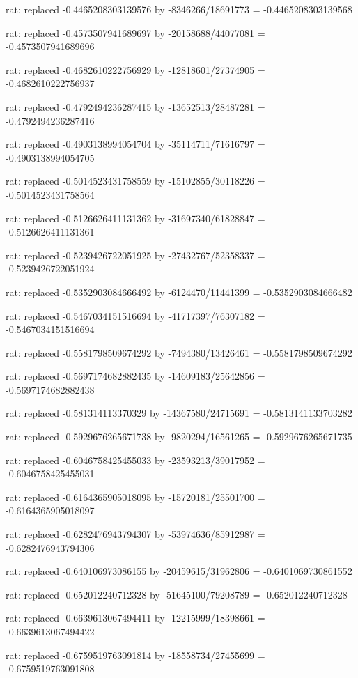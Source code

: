 \documentclass[a4paper,10pt]{article}
\begin{document}
\begin{eulernotebook}
\begin{eulercomment}
\begin{eulercomment}
\begin{eulercomment}
\begin{eulercomment}
\begin{eulercomment}
\begin{eulercomment}
\begin{eulercomment}
\begin{eulercomment}
\begin{eulercomment}
\begin{eulercomment}
\begin{eulercomment}
\begin{eulercomment}
\begin{eulercomment}
\begin{eulercomment}
\begin{eulercomment}
\begin{eulercomment}
\begin{euleroutput}
  rat: replaced -0.4465208303139576 by -8346266/18691773 = -0.4465208303139568
  
  rat: replaced -0.4573507941689697 by -20158688/44077081 = -0.4573507941689696
  
  rat: replaced -0.4682610222756929 by -12818601/27374905 = -0.4682610222756937
  
  rat: replaced -0.4792494236287415 by -13652513/28487281 = -0.4792494236287416
  
  rat: replaced -0.4903138994054704 by -35114711/71616797 = -0.4903138994054705
  
  rat: replaced -0.5014523431758559 by -15102855/30118226 = -0.5014523431758564
  
  rat: replaced -0.5126626411131362 by -31697340/61828847 = -0.5126626411131361
  
  rat: replaced -0.5239426722051925 by -27432767/52358337 = -0.5239426722051924
  
  rat: replaced -0.5352903084666492 by -6124470/11441399 = -0.5352903084666482
  
  rat: replaced -0.5467034151516694 by -41717397/76307182 = -0.5467034151516694
  
  rat: replaced -0.5581798509674292 by -7494380/13426461 = -0.5581798509674292
  
  rat: replaced -0.5697174682882435 by -14609183/25642856 = -0.5697174682882438
  
  rat: replaced -0.581314113370329 by -14367580/24715691 = -0.5813141133703282
  
  rat: replaced -0.5929676265671738 by -9820294/16561265 = -0.5929676265671735
  
  rat: replaced -0.6046758425455033 by -23593213/39017952 = -0.6046758425455031
  
  rat: replaced -0.6164365905018095 by -15720181/25501700 = -0.6164365905018097
  
  rat: replaced -0.6282476943794307 by -53974636/85912987 = -0.6282476943794306
  
  rat: replaced -0.640106973086155 by -20459615/31962806 = -0.6401069730861552
  
  rat: replaced -0.652012240712328 by -51645100/79208789 = -0.652012240712328
  
  rat: replaced -0.6639613067494411 by -12215999/18398661 = -0.6639613067494422
  
  rat: replaced -0.6759519763091814 by -18558734/27455699 = -0.6759519763091808
  

\end{euleroutput}
\end{eulercomment}
\end{eulercomment}
\end{eulercomment}
\end{eulercomment}
\end{eulercomment}
\end{eulercomment}
\end{eulercomment}
\end{eulercomment}
\end{eulercomment}
\end{eulercomment}
\end{eulercomment}
\end{eulercomment}
\end{eulercomment}
\end{eulercomment}
\end{eulercomment}
\end{eulercomment}
\end{eulernotebook}
\end{document}
